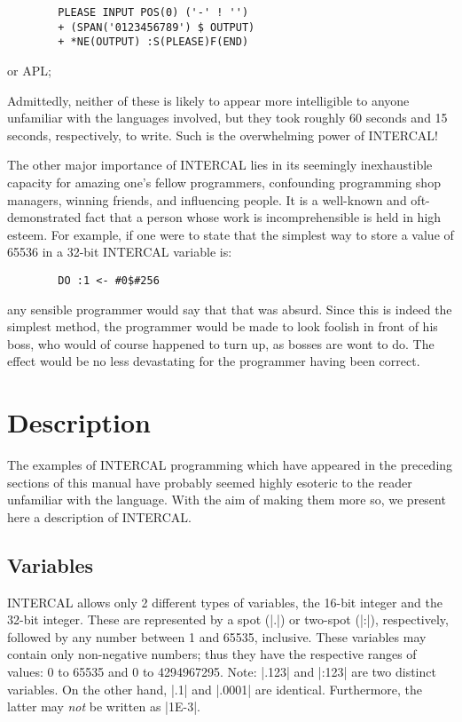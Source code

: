 \begin{verbatim}
        PLEASE INPUT POS(0) ('-' ! '')
        + (SPAN('0123456789') $ OUTPUT)
        + *NE(OUTPUT) :S(PLEASE)F(END)
\end{verbatim}
\noindent or APL;


Admittedly, neither of these is likely to appear more intelligible to
anyone unfamiliar with the languages involved, but they took roughly 60
seconds and 15 seconds, respectively, to write.  Such is the overwhelming
power of INTERCAL!

The other major importance of INTERCAL lies in its seemingly inexhaustible
capacity for amazing one's fellow programmers, confounding programming shop
managers, winning friends, and influencing people.  It is a well-known and
oft-demonstrated fact that a person whose work is incomprehensible is held
in high esteem.  For example, if one were to state that the simplest way to
store a value of 65536 in a 32-bit INTERCAL variable is:

\begin{verbatim}
        DO :1 <- #0$#256
\end{verbatim}
any sensible programmer would say that that was absurd.  Since this is
indeed the simplest method, the programmer would be made to look foolish in
front of his boss, who would of course happened to turn up, as bosses are
wont to do.  The effect would be no less devastating for the programmer
having been correct.







\section{Description}

The examples of INTERCAL programming which have appeared in the preceding
sections of this manual have probably seemed highly esoteric to the reader
unfamiliar with the language.  With the aim of making them more so, we
present here a description of INTERCAL.


\subsection{Variables}

INTERCAL allows only 2 different types of variables, the 16-bit integer
and the 32-bit integer.  These are represented by a spot (|.|) or two-spot
(|:|), respectively, followed by any number between 1 and 65535, inclusive.
These variables may contain only non-negative numbers; thus they have the
respective ranges of values: 0 to 65535 and 0 to 4294967295.  Note: |.123|
and |:123| are two distinct variables.  On the other hand, |.1| and |.0001|
are identical.  Furthermore, the latter may {\em not} be written as |1E-3|.

